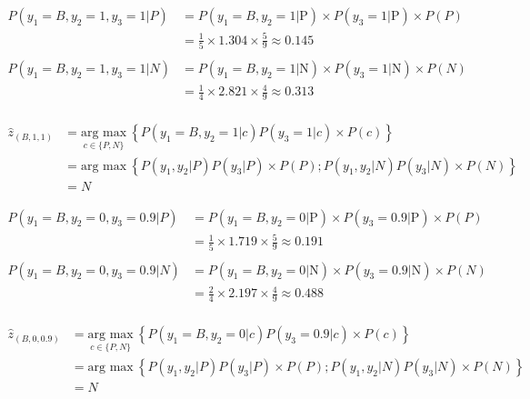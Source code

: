 \documentclass[12pt]{article}
\begin{document}
\begin{enumerate}[leftmargin=\labelsep]
    \begin{equation*}
        \begin{aligned}
        P(y_1 = B, y_2 = 1, y_3 = 1 | P) &= P(y_1 = B, y_2 = 1 | \text{P}) \times P(y_3 = 1 | \text{P}) \times P(P) \\
        &= \frac{1}{5} \times 1.304 \times \frac{5}{9} \approx 0.145\\
        \\
        P(y_1 = B, y_2 = 1, y_3 = 1 | N) &= P(y_1 = B, y_2 = 1 | \text{N}) \times P(y_3 = 1 | \text{N}) \times P(N) \\
        &= \frac{1}{4} \times 2.821 \times \frac{4}{9} \approx 0.313\\
        \end{aligned}
    \end{equation*}
    
    \begin{equation*}
        \begin{aligned}
            \hat{z}_{(B, 1, 1)} &= \underset{c \in \{P,N\}}{\text{arg max}} \medspace \left\{P(y_1 = B, y_2 = 1 | c) P(y_3 = 1| c) \times P(c)\right\}\\
                          & = \text{arg max} \medspace \left\{P(y_1, y_2 | P) P(y_3| P) \times P(P); P(y_1, y_2 | N) P(y_3| N) \times P(N)\right\} \\
                          & = N
        \end{aligned}
    \end{equation*}

    \begin{equation*}
        \begin{aligned}
        P(y_1 = B, y_2 = 0, y_3 = 0.9 | P) &= P(y_1 = B, y_2 = 0 | \text{P}) \times P(y_3 = 0.9 | \text{P}) \times P(P) \\
        &= \frac{1}{5} \times 1.719 \times \frac{5}{9} \approx 0.191\\
        \\
        P(y_1 = B, y_2 = 0, y_3 = 0.9 | N) &= P(y_1 = B, y_2 = 0 | \text{N}) \times P(y_3 = 0.9 | \text{N}) \times P(N) \\
        &= \frac{2}{4} \times 2.197 \times \frac{4}{9} \approx 0.488\\
        \end{aligned}
    \end{equation*}

    \begin{equation*}
        \begin{aligned}
            \hat{z}_{(B, 0, 0.9)} &= \underset{c \in \{P,N\}}{\text{arg max}} \medspace \left\{P(y_1 = B, y_2 = 0 | c) P(y_3 = 0.9| c) \times P(c)\right\}\\
                          & = \text{arg max} \medspace \left\{P(y_1, y_2 | P) P(y_3| P) \times P(P); P(y_1, y_2 | N) P(y_3| N) \times P(N)\right\} \\
                          & = N 
        \end{aligned}
    \end{equation*}


\end{enumerate}
\end{document}
